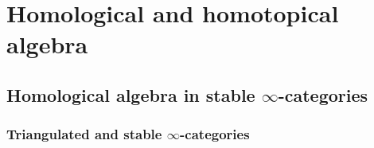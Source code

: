 \chapter{Homological and homotopical algebra}
    \begin{abstract}
        
    \end{abstract}
    
    \minitoc
    
    \section{Homological algebra in stable \texorpdfstring{$\infty$}{}-categories} \label{section: homological_algebra}
        \subsection{Triangulated and stable \texorpdfstring{$\infty$}{}-categories}
